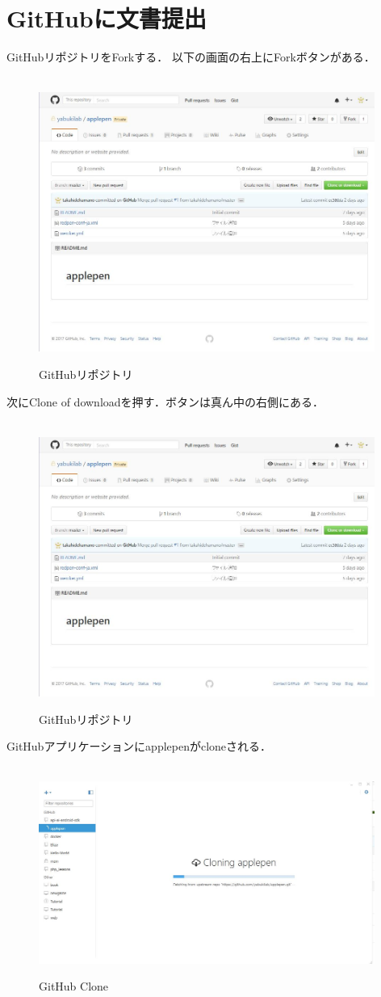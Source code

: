 \chapter{GitHubに文書提出}
GitHubリポジトリをForkする．
以下の画面の右上にForkボタンがある．
\begin{figure}
\centering　
\includegraphics[width=11cm]{17.JPG}
\caption{GitHubリポジトリ}\label{tab:uac}
\end{figure}
\newpage
次にClone of downloadを押す．ボタンは真ん中の右側にある．
\begin{figure}[htb]
\centering　
\includegraphics[width=11cm]{17.JPG}
\caption{GitHubリポジトリ}\label{tab:uac}
\end{figure}
\newpage
GitHubアプリケーションにapplepenがcloneされる．
\begin{figure}
\centering　
\includegraphics[width=11cm]{19.JPG}
\caption{GitHub Clone}\label{tab:uac}
\end{figure}

